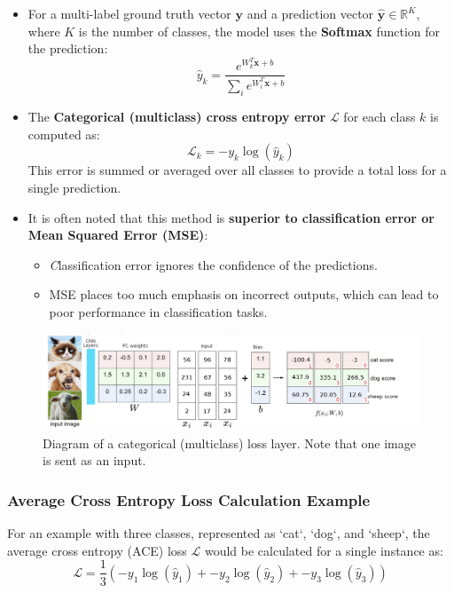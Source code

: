 \begin{itemize}
    \item For a multi-label ground truth vector \( \mathbf{y} \) and a prediction vector \( \hat{\mathbf{y}} \in \mathbb{R}^K \), where \( K \) is the number of classes, the model uses the \textbf{Softmax} function for the prediction:
    \[ \hat{y}_k = \frac{e^{W_k^T\mathbf{x}+b}}{\sum_{i}e^{W_i^T\mathbf{x}+b}} \]
    \item The \textbf{Categorical (multiclass) cross entropy error} \( \mathcal{L} \) for each class \( k \) is computed as:
    \[ \mathcal{L}_k = -y_k \log(\hat{y}_k) \]
    This error is summed or averaged over all classes to provide a total loss for a single prediction.
    
    \item It is often noted that this method is \textbf{superior to classification error or Mean Squared Error (MSE)}:
    \begin{itemize}
        \item \textit Classification error ignores the confidence of the predictions.
        \item MSE places too much emphasis on incorrect outputs, which can lead to poor performance in classification tasks.
    \end{itemize}
\end{itemize}


\begin{figure}[H]
    \centering
    \includegraphics[width=0.85\linewidth]{img/animals.png}
    \caption{Diagram of a categorical (multiclass) loss layer. Note that one image is sent as an input.}
    
\end{figure}

\subsubsection*{Average Cross Entropy Loss Calculation Example}
For an example with three classes, represented as `cat`, `dog`, and `sheep`, the average cross entropy (ACE) loss \( \mathcal{L} \) would be calculated for a single instance as:
\[ \mathcal{L} = \frac{1}{3} \left( -y_{1} \log(\hat{y}_{1}) + -y_{2} \log(\hat{y}_{2}) + -y_{3} \log(\hat{y}_{3}) \right) \]

